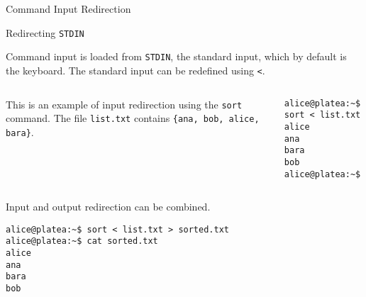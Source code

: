 \begin{frame}[t,fragile]{Command Input Redirection}


  \begin{block}{Redirecting  \alert{\texttt{STDIN}}}
    {\footnotesize
      Command input is loaded from \alert{\texttt{STDIN}}, the standard input, which by default is the keyboard. The standard input can be redefined using \alert{\texttt{<}}.


}
{\scriptsize

  \begin{columns}
      This is an example of input redirection using the \texttt{sort} command. The file \texttt{list.txt} contains \texttt{\{ana, bob, alice, bara\}}.
        \hspace{-3cm}
        \begin{lstlisting}
alice@platea:~$ sort < list.txt
alice
ana
bara
bob
alice@platea:~$
       \end{lstlisting}
    \end{columns}
  }
    {\footnotesize
       Input and output redirection can be combined.
{\scriptsize
      \begin{lstlisting}
alice@platea:~$ sort < list.txt > sorted.txt
alice@platea:~$ cat sorted.txt
alice
ana
bara
bob
      \end{lstlisting}
 }
}
  \end{block}
  
\end{frame}
